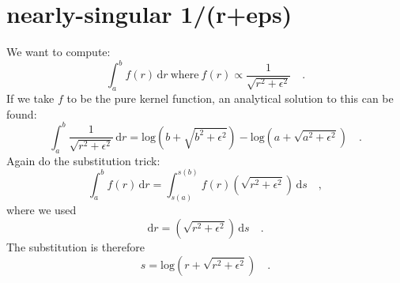 \documentclass[a4paper,10pt]{article}
\begin{document}
\section{nearly-singular 1/(r+eps)}
We want to compute:
\begin{equation}
  \int_a^b f(r) \,\mathrm{d}r ~ \mathrm{where} ~ f(r) \propto \frac{1}{\sqrt{r^2 + \epsilon^2}} \quad .
\end{equation}
If we take $f$ to be the pure kernel function, an analytical solution to this can be found:
\begin{equation}
  \int_a^b \frac{1}{\sqrt{r^2 + \epsilon^2}} \,\mathrm{d}r = \mathrm{log}\left( b + \sqrt{b^2 + \epsilon^2} \right) - \mathrm{log}\left( a + \sqrt{a^2 + \epsilon^2} \right) \quad .
\end{equation}
Again do the substitution trick:
\begin{equation}
  \int_a^b f(r) \,\mathrm{d}r = \int_{s(a)}^{s(b)} f(r) \left(\sqrt{r^2 + \epsilon^2}\right) \,\mathrm{d}s \quad ,
\end{equation}
where we used
\begin{equation}
  \mathrm{d}r = \left(\sqrt{r^2 + \epsilon^2}\right) \,\mathrm{d}s \quad .
\end{equation}
The substitution is therefore
\begin{equation}
  s = \mathrm{log}\left(r + \sqrt{r^2 + \epsilon^2}\right) \quad .
\end{equation}
\end{document}
